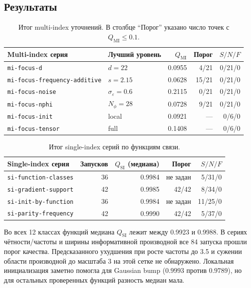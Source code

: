 \documentclass[11pt,a4paper]{article}
\newcommand{\code}[1]{\texttt{#1}}
\newcommand{\qsi}{Q_{\mathrm{SI}}}
\newcommand{\qmi}{Q_{\mathrm{MI}}}
\newcommand{\snf}{S/N/F}
\begin{document}
\subsection{Результаты}

\begin{table}[ht]
\centering
\small
\begin{tabular}{l|l|r|r|r}
\hline
Multi-index серия & Лучший уровень & $\qmi$ & Порог & $\snf$ \\
\hline
\code{mi-focus-d} & $d=22$ & 0.0955 & 4/21 & 0/21/0 \\
\code{mi-focus-frequency-additive} & $s=2.15$ & 0.0628 & 15/21 & 0/21/0 \\
\code{mi-focus-noise} & $\sigma_\varepsilon=0.6$ & 0.2115 & 0/21 & 0/21/0 \\
\code{mi-focus-nphi} & $N_\phi=28$ & 0.0728 & 9/21 & 0/21/0 \\
\code{mi-focus-init} & local & 0.0921 & --- & 0/6/0 \\
\code{mi-focus-tensor} & full & 0.1408 & --- & 0/6/0 \\
\hline
\end{tabular}
\caption{Итог multi-index уточнений. В столбце ``Порог'' указано число
точек с $\qmi\leq0.1$.}
\label{tab:function-mi-results}
\end{table}

\begin{table}[ht]
\centering
\small
\begin{tabularx}{\textwidth}{Yrrrr}
\toprule
Single-index серия & Запусков & $\qsi$ (медиана) & Порог & $\snf$ \\
\midrule
\code{si-function-classes} & 36 & 0.9984 & не задан & 5/31/0 \\
\code{si-gradient-support} & 42 & 0.9985 & 42/42 & 8/34/0 \\
\code{si-init-by-function} & 36 & 0.9984 & не задан & 11/25/0 \\
\code{si-parity-frequency} & 42 & 0.9990 & 42/42 & 5/37/0 \\
\bottomrule
\end{tabularx}
\caption{Итог single-index серий по функциям связи.}
\label{tab:function-si-results}
\end{table}

Во всех 12 классах функций медиана $\qsi$ лежит между 0.9923 и 0.9988.
В сериях чётности/частоты и ширины информативной производной все 84 запуска
прошли порог качества. Предсказанного ухудшения при росте частоты до 3.5 и
сужении области производной до масштаба 3 на этой сетке не обнаружено.
Локальная инициализация заметно помогла для Gaussian bump
($0.9993$ против $0.9789$), но для остальных проверенных функций разность
медиан мала.
\end{document}
